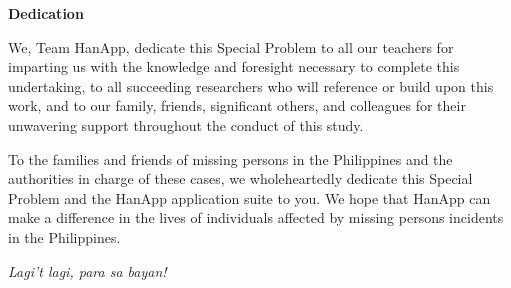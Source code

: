 \begin{center}
	\textbf{Dedication}
\end{center}

We, Team HanApp, dedicate this Special Problem to all our teachers for imparting us with the knowledge and foresight necessary to complete this undertaking, to all succeeding researchers who will reference or build upon this work, and to our family, friends, significant others, and colleagues for their unwavering support throughout the conduct of this study.

To the families and friends of missing persons in the Philippines and the authorities in charge of these cases, we wholeheartedly dedicate this Special Problem and the HanApp application suite to you. We hope that HanApp can make a difference in the lives of individuals affected by missing persons incidents in the Philippines.

\textit{Lagi't lagi, para sa bayan!}
